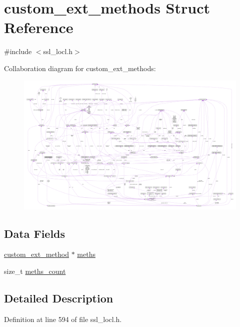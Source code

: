 \hypertarget{structcustom__ext__methods}{}\section{custom\+\_\+ext\+\_\+methods Struct Reference}
\label{structcustom__ext__methods}


{\ttfamily \#include $<$ssl\+\_\+locl.\+h$>$}



Collaboration diagram for custom\+\_\+ext\+\_\+methods\+:\nopagebreak
\begin{figure}[H]
\begin{center}
\leavevmode
\includegraphics[width=350pt]{structcustom__ext__methods__coll__graph}
\end{center}
\end{figure}
\subsection*{Data Fields}
\begin{DoxyCompactItemize}
\item 
\hyperlink{structcustom__ext__method}{custom\+\_\+ext\+\_\+method} $\ast$ \hyperlink{structcustom__ext__methods_abd441cd18172308780c24e75d50d2ad6}{meths}
\item 
size\+\_\+t \hyperlink{structcustom__ext__methods_a0fd4e0f2c0a9a79f2fb7249c3eb58111}{meths\+\_\+count}
\end{DoxyCompactItemize}


\subsection{Detailed Description}


Definition at line 594 of file ssl\+\_\+locl.\+h.



